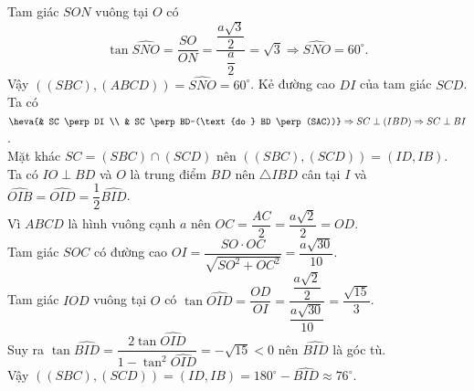 \begin{ex}
{\begin{itemchoice}
			Tam giác $SON$ vuông tại $O$  có
			$$\tan \widehat{SNO}=\dfrac{SO}{ON}=\dfrac{\dfrac{a  \sqrt{3}}{2}}{\dfrac{a}{2}}=\sqrt{3} \Rightarrow \widehat{SNO}=60^{\circ}.$$
			Vậy $\left((SBC),(ABCD)\right) =  \widehat{SNO} = 60^{\circ}$.
			\itemch Kẻ đường cao $DI$  của tam giác $SCD$.\\
			Ta có $\heva{& SC \perp DI \\ &  SC \perp BD~(\text{do } BD \perp (SAC))} \Rightarrow SC \perp (IBD) \Rightarrow SC \perp BI$.\\
			Mặt khác  $SC = (SBC) \cap (SCD)$ nên $\left((SBC),(SCD)\right)=(ID, IB)$.\\
			Ta có $IO \perp BD$ và $O$  là trung điểm $BD$ nên $\triangle IBD$ cân tại $I$ và $\widehat{OIB}=\widehat{OID}=\dfrac{1}{2} \widehat{BID}$.\\
			Vì $ABCD$ là  hình vuông cạnh $a$ nên $OC=\dfrac{AC}{2}=\dfrac{a \sqrt{2}}{2}=OD$.\\
			Tam giác $SOC$ có  đường cao $OI=\dfrac{SO \cdot OC}{\sqrt{SO^2+OC^2}}=\dfrac{a \sqrt{30}}{10}$.\\
			Tam giác  $IOD$ vuông tại $O$ có $\tan \widehat{OID}=\dfrac{OD}{OI}=\dfrac{\dfrac{a \sqrt{2}}{2}}{\dfrac{a \sqrt{30}}{10}}=\dfrac{\sqrt{15}}{3}$.\\
			Suy ra $\tan \widehat{BID}=\dfrac{2 \tan  \widehat{OID}}{1-\tan ^2 \widehat{OID}}=-\sqrt{15}<0$ nên $\widehat{BID}$ là góc tù.\\
			 Vậy $\left((SBC),(SCD)\right)=(ID,IB)=180^\circ - \widehat{BID} \approx 76^\circ$.
		\end{itemchoice}
	} 
\end{ex}

